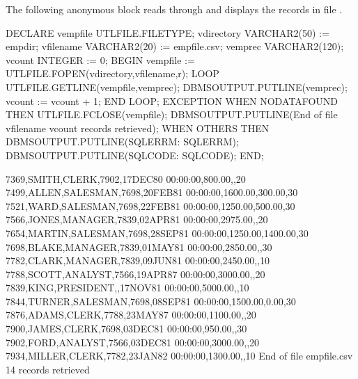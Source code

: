 \documentclass[letterpaper,10pt,english,openany,oneside]{sphinxmanual}
\begin{document}

The following anonymous block reads through and displays the records in
file .

%
\begin{sphinxVerbatim}[commandchars=\\\{\}]
DECLARE
    v\PYGZus{}empfile       UTL\PYGZus{}FILE.FILE\PYGZus{}TYPE;
    v\PYGZus{}directory     VARCHAR2(50) := \PYGZsq{}empdir\PYGZsq{};
    v\PYGZus{}filename      VARCHAR2(20) := \PYGZsq{}empfile.csv\PYGZsq{};
    v\PYGZus{}emprec        VARCHAR2(120);
    v\PYGZus{}count         INTEGER := 0;
BEGIN
    v\PYGZus{}empfile := UTL\PYGZus{}FILE.FOPEN(v\PYGZus{}directory,v\PYGZus{}filename,\PYGZsq{}r\PYGZsq{});
    LOOP
        UTL\PYGZus{}FILE.GET\PYGZus{}LINE(v\PYGZus{}empfile,v\PYGZus{}emprec);
        DBMS\PYGZus{}OUTPUT.PUT\PYGZus{}LINE(v\PYGZus{}emprec);
        v\PYGZus{}count := v\PYGZus{}count + 1;
    END LOOP;
    EXCEPTION
        WHEN NO\PYGZus{}DATA\PYGZus{}FOUND THEN
            UTL\PYGZus{}FILE.FCLOSE(v\PYGZus{}empfile);
            DBMS\PYGZus{}OUTPUT.PUT\PYGZus{}LINE(\PYGZsq{}End of file \PYGZsq{} \textbar{}\textbar{} v\PYGZus{}filename \textbar{}\textbar{} \PYGZsq{} \PYGZhy{} \PYGZsq{} \textbar{}\textbar{}
                v\PYGZus{}count \textbar{}\textbar{} \PYGZsq{} records retrieved\PYGZsq{});
        WHEN OTHERS THEN
            DBMS\PYGZus{}OUTPUT.PUT\PYGZus{}LINE(\PYGZsq{}SQLERRM: \PYGZsq{} \textbar{}\textbar{} SQLERRM);
            DBMS\PYGZus{}OUTPUT.PUT\PYGZus{}LINE(\PYGZsq{}SQLCODE: \PYGZsq{} \textbar{}\textbar{} SQLCODE);
END;

7369,SMITH,CLERK,7902,17\PYGZhy{}DEC\PYGZhy{}80 00:00:00,800.00,,20
7499,ALLEN,SALESMAN,7698,20\PYGZhy{}FEB\PYGZhy{}81 00:00:00,1600.00,300.00,30
7521,WARD,SALESMAN,7698,22\PYGZhy{}FEB\PYGZhy{}81 00:00:00,1250.00,500.00,30
7566,JONES,MANAGER,7839,02\PYGZhy{}APR\PYGZhy{}81 00:00:00,2975.00,,20
7654,MARTIN,SALESMAN,7698,28\PYGZhy{}SEP\PYGZhy{}81 00:00:00,1250.00,1400.00,30
7698,BLAKE,MANAGER,7839,01\PYGZhy{}MAY\PYGZhy{}81 00:00:00,2850.00,,30
7782,CLARK,MANAGER,7839,09\PYGZhy{}JUN\PYGZhy{}81 00:00:00,2450.00,,10
7788,SCOTT,ANALYST,7566,19\PYGZhy{}APR\PYGZhy{}87 00:00:00,3000.00,,20
7839,KING,PRESIDENT,,17\PYGZhy{}NOV\PYGZhy{}81 00:00:00,5000.00,,10
7844,TURNER,SALESMAN,7698,08\PYGZhy{}SEP\PYGZhy{}81 00:00:00,1500.00,0.00,30
7876,ADAMS,CLERK,7788,23\PYGZhy{}MAY\PYGZhy{}87 00:00:00,1100.00,,20
7900,JAMES,CLERK,7698,03\PYGZhy{}DEC\PYGZhy{}81 00:00:00,950.00,,30
7902,FORD,ANALYST,7566,03\PYGZhy{}DEC\PYGZhy{}81 00:00:00,3000.00,,20
7934,MILLER,CLERK,7782,23\PYGZhy{}JAN\PYGZhy{}82 00:00:00,1300.00,,10
End of file empfile.csv \PYGZhy{} 14 records retrieved
\end{sphinxVerbatim}
\end{document}
